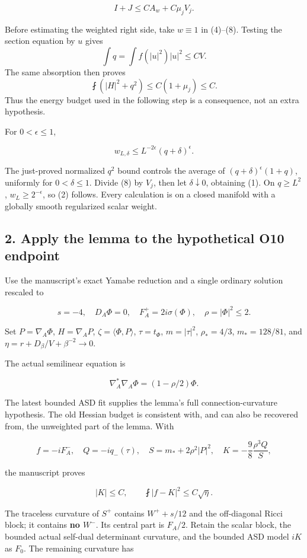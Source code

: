 \documentclass[11pt]{article}
\begin{document}
\[
 I+J\le C A_w+C\mu_jV_j.
\tag{8}
\]

Before estimating the weighted right side, take \(w\equiv1\) in
(4)--(8). Testing the section equation by \(u\) gives \[
\int q=\int f(|u|^2)|u|^2\le CV.
\] The same absorption then proves \[
\fint(|H|^2+q^2)\le C(1+\mu_j)\le C.
\] Thus the energy budget used in the following step is a consequence,
not an extra hypothesis.

For \(0<\epsilon\le1\),

\[
 w_{L,\delta}\le L^{-2\epsilon}(q+\delta)^\epsilon.
\]

The just-proved normalized \(q^2\) bound controls the average of
\((q+\delta)^\epsilon(1+q)\), uniformly for \(0<\delta\le1\). Divide (8)
by \(V_j\), then let \(\delta\downarrow0\), obtaining (1). On
\(q\ge L^2\), \(w_L\ge2^{-\epsilon}\), so (2) follows. Every calculation
is on a closed manifold with a globally smooth regularized scalar
weight.

\hypertarget{apply-the-lemma-to-the-hypothetical-o10-endpoint}{%
\subsection{2. Apply the lemma to the hypothetical O10
endpoint}\label{apply-the-lemma-to-the-hypothetical-o10-endpoint}}

Use the manuscript's exact Yamabe reduction and a single ordinary
solution rescaled to

\[
 s=-4,\quad D_A\Phi=0,\quad F_A^+=2i\sigma(\Phi),
 \quad \rho=|\Phi|^2\le2.
\]

Set \(P=\nabla_A\Phi\), \(H=\nabla_AP\), \(\zeta=\langle\Phi,P\rangle\),
\(\tau=t_\Phi\), \(m=|\tau|^2\), \(\rho_*=4/3\), \(m_*=128/81\), and
\(\eta=r+D_\beta/V+\beta^{-2}\to0\).

The actual semilinear equation is

\[
 \nabla_A^*\nabla_A\Phi=(1-\rho/2)\Phi.\tag{9}
\]

The latest bounded ASD fit supplies the lemma's full
connection-curvature hypothesis. The old Hessian budget is consistent
with, and can also be recovered from, the unweighted part of the lemma.
With

\[
 f=-iF_A^-,\quad Q=-iq_-(\tau),\quad
 S=m_*+2\rho^2|P|^2,\quad
 K=-\frac98\frac{\rho^3Q}{S},
\]

the manuscript proves

\[
 |K|\le C,\qquad \fint|f-K|^2\le C\sqrt\eta.
\tag{10}
\]

The traceless curvature of \(S^+\) contains \(W^++s/12\) and the
off-diagonal Ricci block; it contains \textbf{no \(W^-\)}. Its central
part is \(F_A/2\). Retain the scalar block, the bounded actual self-dual
determinant curvature, and the bounded ASD model \(iK\) as \(F_0\). The
remaining curvature has
\end{document}
